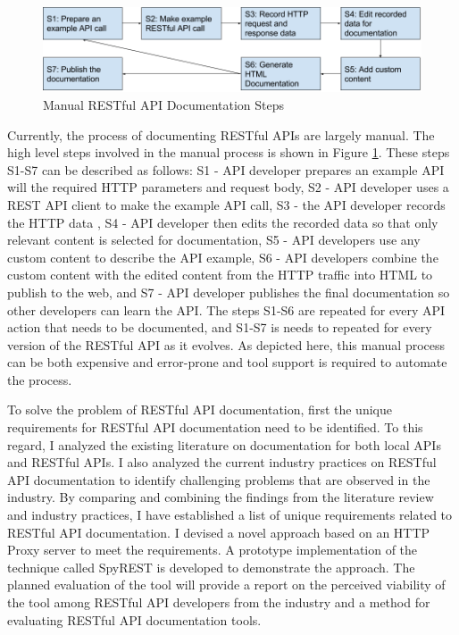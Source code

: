 \documentclass[11pt,oneside]{book}
\begin{document}
\begin{figure}[htb]
  \includegraphics[width=\linewidth]{manual_workflow.png}
  \caption{Manual RESTful API Documentation Steps}
  \label{fig:manual}
\end{figure}

Currently, the process of documenting RESTful APIs are largely manual. The high level steps involved in the manual process is shown in Figure \ref{fig:manual}. These steps S1-S7 can be described as follows: S1 - API developer prepares an example API will the required HTTP parameters and request body, S2 - API developer uses a REST API client to make the example API call, S3 - the API developer records the HTTP data , S4 - API developer then edits the recorded data so that only relevant content is selected for documentation, S5 - API developers use any custom content to describe the API example, S6 - API developers combine the custom content with the edited content from the HTTP traffic into HTML to publish to the web, and S7 - API developer publishes the final documentation so other developers can learn the API. The steps S1-S6 are repeated for every API action that needs to be documented, and S1-S7 is needs to repeated for every version of the RESTful API as it evolves. As depicted here, this manual process can be both expensive and error-prone and tool support is required to automate the process.

To solve the problem of RESTful API documentation, first the unique requirements for RESTful API documentation need to be identified. To this regard, I analyzed the existing literature on documentation for both local APIs and RESTful APIs. I also analyzed the current industry practices on RESTful API documentation to identify challenging problems that are observed in the industry. By comparing and combining the findings from the literature review and industry practices, I have established a list of unique requirements related to RESTful API documentation. I devised a novel approach based on an HTTP Proxy server to meet the requirements. A prototype implementation of the technique called SpyREST is developed to demonstrate the approach. The planned evaluation of the tool will provide a report on the perceived viability of the tool among RESTful API developers from the industry and a method for evaluating RESTful API documentation tools.
\end{document}
